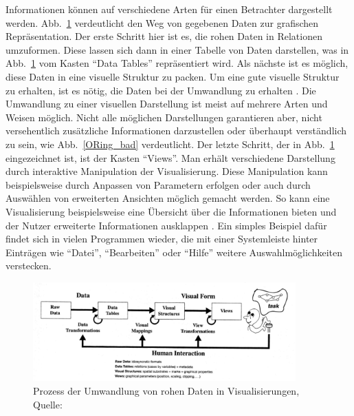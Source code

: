 \documentclass[12pt, a4paper]{article}
\begin{document}
Informationen können auf verschiedene Arten für einen Betrachter dargestellt werden. Abb.~\ref{from_data_to_visualization} verdeutlicht den Weg von gegebenen Daten zur grafischen Repräsentation. Der erste Schritt hier ist es, die rohen Daten in Relationen umzuformen. Diese lassen sich dann in einer Tabelle von Daten darstellen, was in Abb.~\ref{from_data_to_visualization} vom Kasten "`Data Tables"' repräsentiert wird. Als nächste ist es möglich, diese Daten in eine visuelle Struktur zu packen. Um eine gute visuelle Struktur zu erhalten, ist es nötig, die Daten bei der Umwandlung zu erhalten \cite[S.~5]{card1999readings}. Die Umwandlung zu einer visuellen Darstellung ist meist auf mehrere Arten und Weisen möglich. Nicht alle möglichen Darstellungen garantieren aber, nicht versehentlich zusätzliche Informationen darzustellen oder überhaupt verständlich zu sein, wie Abb.~\ref{ORing_bad} verdeutlicht. Der letzte Schritt, der in Abb.~\ref{from_data_to_visualization} eingezeichnet ist, ist der Kasten "`Views"'. Man erhält verschiedene Darstellung durch interaktive Manipulation der Visualisierung. Diese Manipulation kann beispielsweise durch Anpassen von Parametern erfolgen oder auch durch Auswählen von erweiterten Ansichten möglich gemacht werden. So kann eine Visualisierung beispielsweise eine Übersicht über die Informationen bieten und der Nutzer erweiterte Informationen ausklappen \cite[S.~31]{card1999readings}. Ein simples Beispiel dafür findet sich in vielen Programmen wieder, die mit einer Systemleiste hinter Einträgen wie "`Datei"', "`Bearbeiten"' oder "`Hilfe"' weitere Auswahlmöglichkeiten verstecken.\\

\begin{figure}[h!]
\centering
\includegraphics[width=0.9\textwidth]{from_data_to_visualization.png}
\caption[Prozess der Umwandlung von rohen Daten in Visualisierungen]{Prozess der Umwandlung von rohen Daten in Visualisierungen, Quelle: \protect{}}
\label{from_data_to_visualization}
\end{figure}
\end{document}

